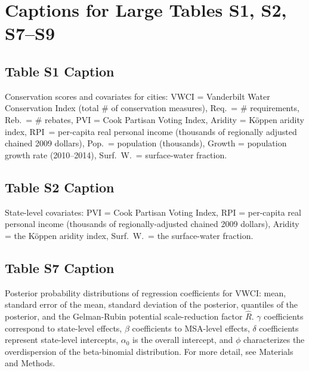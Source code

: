 \documentclass[draft]{agujournal}
\begin{document}
%
%
\iffalse
%
\section*{Captions for Large Tables S1, S2, S7--S9}
\subsection*{Table S1 Caption}
\setcounter{table}{0}%
\begin{table}[H]
\centering
\caption{Conservation scores and covariates for  cities: VWCI = Vanderbilt Water Conservation Index (total \# of conservation measures), Req.\ = \# requirements, Reb.\ = \# rebates, PVI = Cook Partisan Voting Index, Aridity = K\"oppen aridity index, RPI\ = per-capita real personal income (thousands of regionally adjusted chained 2009 dollars), Pop.\ = population (thousands), Growth = population growth rate (2010--2014), Surf.\ W.\ = surface-water fraction.}
\end{table}


\subsection*{Table S2 Caption}
\setcounter{table}{1}%
\begin{table}[H]
\centering
\caption{State-level covariates: PVI = Cook Partisan Voting Index, RPI = per-capita real personal income (thousands of regionally-adjusted chained 2009 dollars), Aridity = the K\"oppen aridity index, Surf.\ W.\ = the surface-water fraction.}
\end{table}


\subsection*{Table S7 Caption}
\setcounter{table}{6}%
\begin{table}[H]
\centering
\caption{Posterior probability distributions of regression coefficients for VWCI: mean, standard error of the mean, standard deviation of the posterior, quantiles of the posterior, and the Gelman-Rubin potential scale-reduction factor $\hat R$. $\gamma$ coefficients correspond to state-level effects, $\beta$ coefficients to MSA-level effects, $\delta$ coefficients represent state-level intercepts, $\alpha_0$ is the overall intercept, and $\phi$ characterizes the overdispersion of the beta-binomial distribution. For more detail, see Materials and Methods.}
\end{table}
\end{document}
